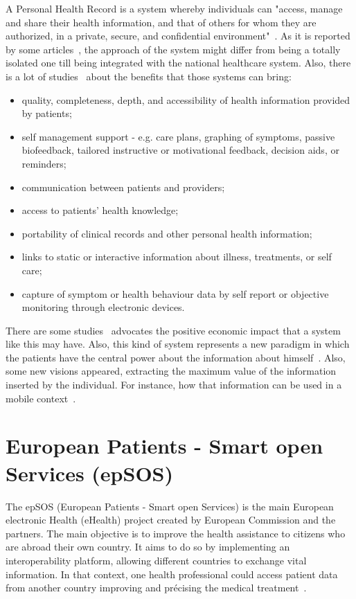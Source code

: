A Personal Health Record is a system whereby individuals can "access, manage and share their health information, and that of others for whom they are authorized, in a private, secure, and confidential environment"~\citep{Health2003}. As it is reported by some articles~\citep{Tang2006,Tang2009}, the approach of the system might differ from being a totally isolated one till being integrated with the national healthcare system. Also, there is a lot of studies~\cite{Tang2009,Pagliari2007,Detmer2008, Fricton2008} about the benefits that those systems can bring:
\begin{itemize}
\item quality, completeness, depth, and accessibility of health information provided by patients;
\item self management support - e.g. care plans, graphing of symptoms, passive biofeedback, tailored instructive or motivational feedback, decision aids, or reminders;
\item communication between patients and providers;
\item access to patients' health knowledge;
\item portability of clinical records and other personal health information;
\item links to static or interactive information about illness, treatments, or self care;
\item capture of symptom or health behaviour data by self report or objective monitoring through electronic devices.
\end{itemize}

There are some studies~\cite{Kaelber2008,Gearon2007} advocates the positive economic impact that a system like this may have. Also, this kind of system represents a new paradigm in which the patients have the central power about the information about himself~\citep{Ball2007}. Also, some new visions appeared, extracting the maximum value of the information inserted by the individual. For instance, how that information can be used in a mobile context~\citep{Brief2010}.






\section{European Patients - Smart open Services (epSOS)} \label{sec:epsos}

The epSOS (European Patients - Smart open Services) is the main European electronic Health (eHealth) project created by European Commission and the partners. The main objective is to improve the health assistance to citizens who are abroad their own country. It aims to do so by implementing an interoperability platform, allowing different countries to exchange vital information. In that context, one health professional could access patient data from another country improving and précising the medical treatment~\citep{EpSOS}.

